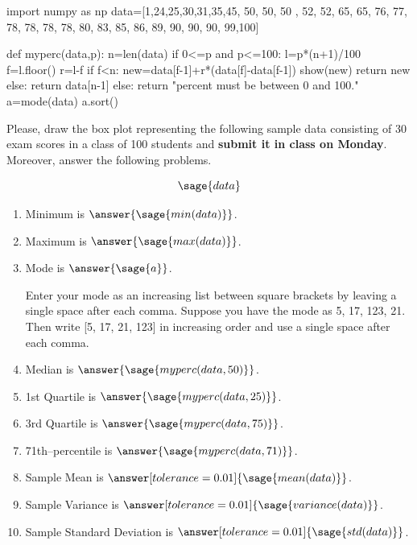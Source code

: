 \documentclass{ximera}
\begin{document}
\begin{problem}
\begin{sagesilent}
import numpy as np
data=[1,24,25,30,31,35,45, 50, 50, 50 , 52, 52, 65, 65, 76, 77, 78, 78, 78, 78, 80, 83, 85, 86, 89, 90, 90, 90, 99,100]

def myperc(data,p):
    n=len(data)
    if 0<=p and p<=100:
        l=p*(n+1)/100
        f=l.floor()
        r=l-f
        if f<n:
            new=data[f-1]+r*(data[f]-data[f-1])
            show(new)
            return new
        else:
            return data[n-1]
    else:
        return "percent must be between 0 and 100."
a=mode(data)
a.sort()
\end{sagesilent}
Please, draw the box plot representing the following sample data consisting of 30 exam scores in a class of 100 students and \textbf{submit it in class on Monday}. Moreover, answer the following problems.

$$\sage{data}$$

\begin{enumerate}
    \item Minimum is $\answer{\sage{min(data)}}$.
    \item Maximum is $\answer{\sage{max(data)}}$.
    \item Mode is $\answer{\sage{a}}$.
        \begin{hint}
        Enter your mode as an increasing list between square brackets by leaving a single space after each comma. 
        Suppose you have the mode as 5, 17, 123, 21. Then write {\color{red}[5, 17, 21, 123]} in increasing         order and use a single space after each comma.
        \end{hint}
    \item Median is $\answer{\sage{myperc(data,50)}}$.
    \item 1st Quartile is $\answer{\sage{myperc(data,25)}}$.
    \item 3rd Quartile is $\answer{\sage{myperc(data,75)}}$.
    \item 71th--percentile is $\answer{\sage{myperc(data,71)}}$.
    \item Sample Mean is $\answer[tolerance=0.01]{\sage{mean(data)}}$.
    \item Sample Variance is $\answer[tolerance=0.01]{\sage{variance(data)}}$.
    \item Sample Standard Deviation is $\answer[tolerance=0.01]{\sage{std(data)}}$.
\end{enumerate}
\end{problem}
\end{document}
